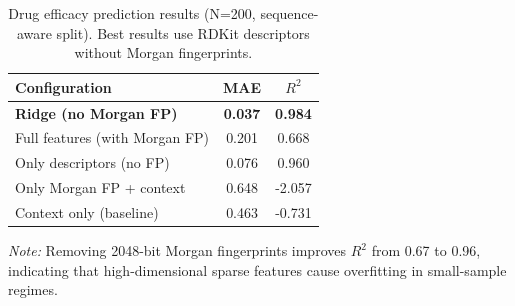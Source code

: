 \begin{table}[htbp]
\centering
\caption{Drug efficacy prediction results (N=200, sequence-aware split). Best results use RDKit descriptors without Morgan fingerprints.}
\label{tab:drug_results}
\begin{tabular}{lcc}
\toprule
Configuration & MAE & $R^2$ \\
\midrule
\textbf{Ridge (no Morgan FP)} & \textbf{0.037} & \textbf{0.984} \\
Full features (with Morgan FP) & 0.201 & 0.668 \\
Only descriptors (no FP) & 0.076 & 0.960 \\
Only Morgan FP + context & 0.648 & -2.057 \\
Context only (baseline) & 0.463 & -0.731 \\
\bottomrule
\end{tabular}
\footnotesize {\textit{Note:} Removing 2048-bit Morgan fingerprints improves $R^2$ from 0.67 to 0.96, indicating that high-dimensional sparse features cause overfitting in small-sample regimes.}
\end{table}
